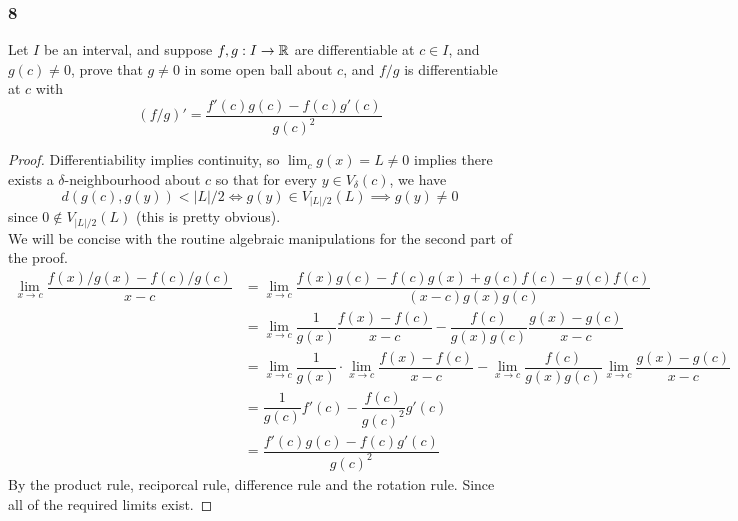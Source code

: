 \documentclass[../main.tex]{subfiles}
\begin{document}
\subsubsection*{8}
\begin{wts}
    Let $I$ be an interval, and suppose $f,g:I\to\mathbb{R}$ are differentiable at $c\in I$, and $g(c)\neq 0$, prove that $g\neq 0$ in some open ball about $c$, and $f/g$ is differentiable at $c$ with \[(f/g)'=\dfrac{f'(c)g(c)-f(c)g'(c)}{g(c)^2}\]
\end{wts}

\begin{proof}
    Differentiability implies continuity, so $\lim_c g(x)=L\neq 0$ implies there exists a $\delta$-neighbourhood about $c$ so that for every $y\in V_\delta (c)$, we have \[d(g(c),g(y))<|L|/2\iff g(y)\in V_{|L|/2}(L)\implies g(y)\neq 0\]
    since $0\notin V_{|L|/2}(L)$ (this is pretty obvious).\\
    
    We will be concise with the routine algebraic manipulations for the second part of the proof.
    \begin{align*}
        \lim_{x\to c}\dfrac{f(x)/g(x)-f(c)/g(c)}{x-c}&= \lim_{x\to c}\dfrac{f(x)g(c)-f(c)g(x)+g(c)f(c)-g(c)f(c)}{(x-c)g(x)g(c)}\\[2ex]
        &=\lim_{x\to c} \dfrac{1}{g(x)}\dfrac{f(x)-f(c)}{x-c} - \dfrac{f(c)}{g(x)g(c)}\dfrac{g(x)-g(c)}{x-c}\\[2ex]
        &=\lim_{x\to c} \dfrac{1}{g(x)}\cdot \lim_{x\to c}\dfrac{f(x)-f(c)}{x-c} - \lim_{x\to c} \dfrac{f(c)}{g(x)g(c)}\lim_{x\to c}\dfrac{g(x)-g(c)}{x-c}\\[2ex]
        &=\dfrac{1}{g(c)}f'(c)-\dfrac{f(c)}{g(c)^2}g'(c)\\[2ex]
        &=\dfrac{f'(c)g(c)-f(c)g'(c)}{g(c)^2}
    \end{align*}
    By the product rule, reciporcal rule, difference rule and the rotation rule. Since all of the required limits exist.
\end{proof}
\end{document}
